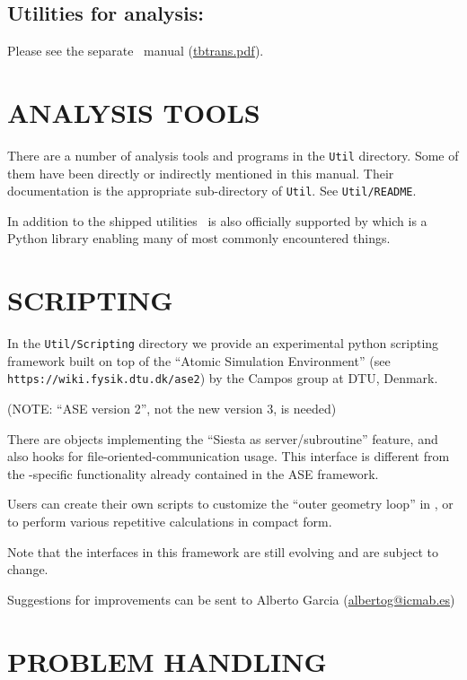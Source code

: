 \subsection{Utilities for analysis:
    \texorpdfstring{\tbtrans}{TBtrans}} 

Please see the separate \tbtrans\ manual
(\href{run:tbtrans.pdf}{tbtrans.pdf}). 


\section{ANALYSIS TOOLS}

There are a number of analysis tools and programs in the \texttt{Util}
directory. Some of them have been directly or indirectly mentioned in
this manual. Their documentation is the appropriate sub-directory of
\texttt{Util}. See \texttt{Util/README}.

In addition to the shipped utilities \siesta\ is also officially
supported by \sisl\cite{sisl} which is a Python library enabling many
of most commonly encountered things.

\section{SCRIPTING}

In the \texttt{Util/Scripting} directory we provide an experimental
python scripting framework built on top of the ``Atomic Simulation
Environment'' (see \texttt{https://wiki.fysik.dtu.dk/ase2}) by the Campos
group at DTU, Denmark.

(NOTE: ``ASE version 2'', not the new version 3, is needed)

There are objects implementing the ``Siesta as server/subroutine'' feature, and
also hooks for file-oriented-communication usage. This interface is
different from the \siesta-specific functionality already
contained in the ASE framework.

Users can create their own scripts to customize the ``outer geometry loop''
in \siesta, or to perform various repetitive calculations in compact form.

Note that the interfaces in this framework are still evolving and are
subject to change.

Suggestions for improvements can be sent to Alberto Garcia
(\href{mailto:albertog@icmab.es}{albertog@icmab.es})

\section{PROBLEM HANDLING}

